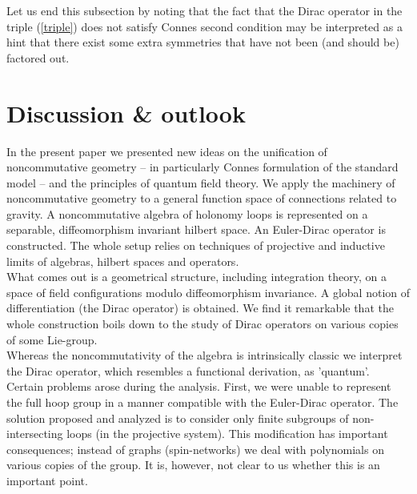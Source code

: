 \documentclass[12pt]{article}
\begin{document}
Let us end this subsection by noting that the fact that the Dirac operator in the triple (\ref{triple}) does not satisfy
Connes second condition may be interpreted as a hint that there exist some
extra symmetries that have not been (and should be) factored out. 


















\section{Discussion \& outlook}
\label{sec-dis}

In the present paper we presented new ideas on the unification of
noncommutative geometry -- in particularly Connes formulation of the standard
model -- and the principles of quantum field theory. We apply the machinery
of noncommutative geometry to a general function space of connections related to
gravity. A noncommutative algebra of holonomy loops is represented on a
separable, diffeomorphism invariant hilbert space. An Euler-Dirac operator is
constructed. The whole setup relies on techniques of projective and inductive
limits of algebras, hilbert spaces and operators.\\

What comes out is a geometrical structure, including integration theory, on a
space of field configurations modulo diffeomorphism invariance. A global
notion of differentiation (the Dirac operator) is obtained. We find it
remarkable that the whole construction boils down to the study of Dirac
operators on various copies of some Lie-group.  \\

Whereas the noncommutativity of the algebra is intrinsically classic we
interpret the Dirac operator, which resembles a functional derivation, as
'quantum'. \\

Certain problems arose during the analysis. First, we were unable to represent
the full hoop group in a manner compatible with the Euler-Dirac operator. The
solution proposed and analyzed is to consider only finite subgroups of
non-intersecting loops (in the projective system). This modification has
important consequences; instead of graphs (spin-networks) we deal with
polynomials on various copies of the group. It is, however, not clear to us
whether this is an important point.
\end{document}
